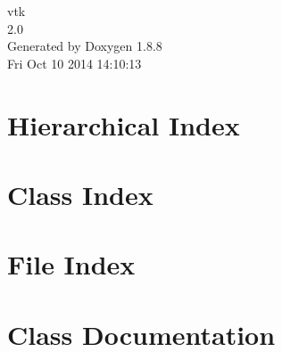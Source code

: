 \documentclass[twoside]{book}
\newcommand{\+}{\discretionary{\mbox{\scriptsize$\hookleftarrow$}}{}{}}
\newcommand{\clearemptydoublepage}{%
  \newpage{\pagestyle{empty}\cleardoublepage}%
}
\begin{document}
\hypersetup{pageanchor=false,
             bookmarks=true,
             bookmarksnumbered=true,
             pdfencoding=unicode
            }
\begin{titlepage}
\vspace*{7cm}
\begin{center}%
{\Large vtk \\[1ex]\large 2.\+0 }\\
\vspace*{1cm}
{\large Generated by Doxygen 1.8.8}\\
\vspace*{0.5cm}
{\small Fri Oct 10 2014 14:10:13}\\
\end{center}
\end{titlepage}
\clearemptydoublepage
\tableofcontents
\clearemptydoublepage
{}
\hypersetup{pageanchor=true}

\chapter{Hierarchical Index}

\chapter{Class Index}

\chapter{File Index}

\chapter{Class Documentation}















\end{document}
